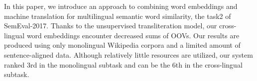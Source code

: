 In this paper, we introduce an approach to combining word embeddings and machine translation for multilingual semantic word similarity, the task2 of SemEval-2017. Thanks to the unsupervised transliteration model, our cross-lingual word embeddings encounter decreased sums of OOVs. Our results are produced using only monolingual Wikipedia corpora and a limited amount of sentence-aligned data. Although relatively little resources are utilized, our system ranked 3rd in the monolingual subtask and can be the 6th in the cross-lingual subtask.

